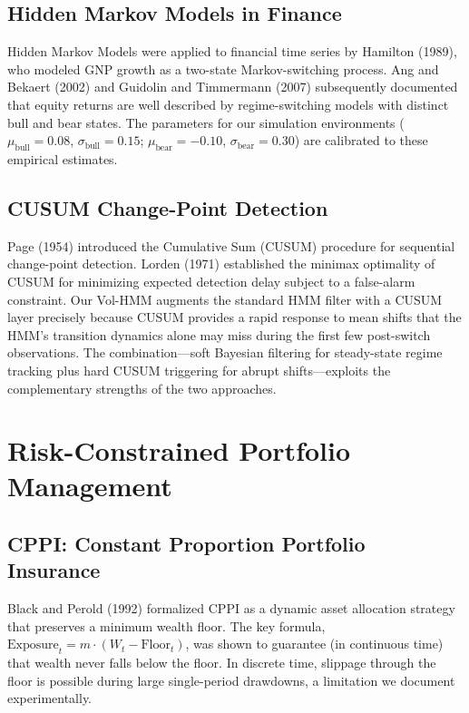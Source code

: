 \subsection{Hidden Markov Models in Finance}

Hidden Markov Models were applied to financial time series by Hamilton (1989),
who modeled GNP growth as a two-state Markov-switching process.  Ang and
Bekaert (2002) and Guidolin and Timmermann (2007) subsequently documented that
equity returns are well described by regime-switching models with distinct bull
and bear states.  The parameters for our simulation environments
($\mu_{\text{bull}} = 0.08$, $\sigma_{\text{bull}} = 0.15$;
$\mu_{\text{bear}} = -0.10$, $\sigma_{\text{bear}} = 0.30$) are calibrated to
these empirical estimates.

\subsection{CUSUM Change-Point Detection}

Page (1954) introduced the Cumulative Sum (CUSUM) procedure for sequential
change-point detection.  Lorden (1971) established the minimax optimality of
CUSUM for minimizing expected detection delay subject to a false-alarm
constraint.  Our Vol-HMM augments the standard HMM filter with a CUSUM layer
precisely because CUSUM provides a rapid response to mean shifts that the
HMM's transition dynamics alone may miss during the first few post-switch
observations.  The combination---soft Bayesian filtering for steady-state
regime tracking plus hard CUSUM triggering for abrupt shifts---exploits the
complementary strengths of the two approaches.

\section{Risk-Constrained Portfolio Management}

\subsection{CPPI: Constant Proportion Portfolio Insurance}

Black and Perold (1992) formalized CPPI as a dynamic asset allocation strategy
that preserves a minimum wealth floor.  The key formula,
$\text{Exposure}_t = m \cdot (W_t - \text{Floor}_t)$, was shown to guarantee
(in continuous time) that wealth never falls below the floor.  In discrete time,
slippage through the floor is possible during large single-period drawdowns, a
limitation we document experimentally.

